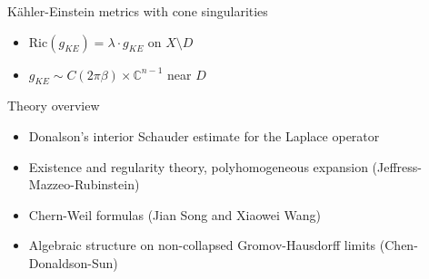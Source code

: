 \documentclass{beamer}
\newcommand{\C}{\mathbb{C}}
\begin{document}
\begin{frame}{K\"ahler-Einstein metrics with cone singularities}
\begin{center}
{
		}
	\end{center}



\begin{itemize}
	\centering
	\item \(\mbox{Ric}(g_{KE}) = \lambda \cdot g_{KE}\) on \(X \setminus D\)
	\item \(g_{KE} \sim C(2\pi\beta) \times  \C^{n-1}\) near \(D\)
\end{itemize}


\end{frame}

\begin{frame}{Theory overview}
	\begin{itemize}
		\setlength{\itemsep}{\fill}
		\pause
		\item Donalson's interior Schauder estimate for the Laplace operator
		\pause
		\item Existence and regularity theory, polyhomogeneous expansion (Jeffress-Mazzeo-Rubinstein)
		\pause
		\item Chern-Weil formulas (Jian Song and Xiaowei Wang)
		\pause
		\item Algebraic structure on non-collapsed Gromov-Hausdorff limits (Chen-Donaldson-Sun)
	\end{itemize}
\end{frame}
\end{document}
